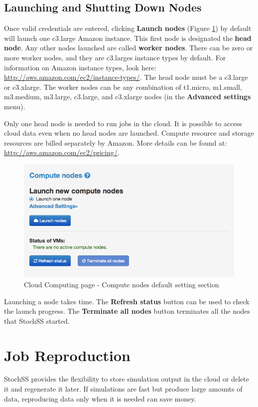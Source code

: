 \subsection{Launching and Shutting Down Nodes}
Once valid credentials are entered, clicking \textbf{Launch nodes} (Figure \ref{fig:2}) by default will launch one c3.large Amazon instance. This first node is designated the \textbf{head node}. Any other nodes launched are called \textbf{worker nodes}. There can be zero or more worker nodes, and they are c3.larges instance types by default. For information on Amazon instance types, look here: \url{http://aws.amazon.com/ec2/instance-types/}. The head node must be a c3.large or c3.xlarge. The worker nodes can be any combination of t1.micro, m1.small, m3.medium, m3.large, c3.large, and c3.xlarge nodes (in the \textbf{Advanced settings} menu).

Only one head node is needed to run jobs in the cloud. It is possible to access cloud data even when no head nodes are launched. Compute resource and storage resources are billed separately by Amazon. More details can be found at: \url{http://aws.amazon.com/ec2/pricing/}.

\begin{figure}[!ht]
\centering
\includegraphics[scale=0.45]{T6/T6_fig_computenode1.png}
\caption{Cloud Computing page - Compute nodes default setting section}
\label{fig:2}
\end{figure}

Launching a node takes time. The \textbf{Refresh status} button can be used to check the launch progress. The \textbf{Terminate all nodes} button terminates all the nodes that StochSS started.

\section{Job Reproduction}
StochSS provides the flexibility to store simulation output in the cloud or delete it and regenerate it later. If simulations are fast but produce large amounts of data, reproducing data only when it is needed can save money.

